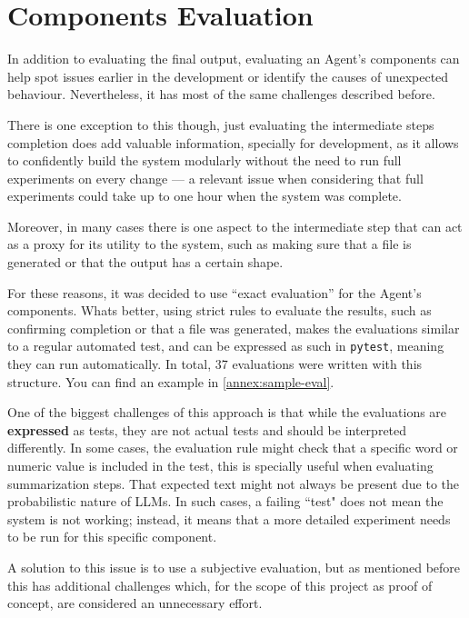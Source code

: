\documentclass[a4paper]{report}
\begin{document}
\section{Components Evaluation}
\label{sec:components-evals}

In addition to evaluating the final output, evaluating an Agent's components can help spot issues earlier in the development or identify the causes of unexpected behaviour. Nevertheless, it has most of the same challenges described before.

There is one exception to this though, just evaluating the intermediate steps completion does add valuable information, specially for development, as it allows to confidently build the system modularly without the need to run full experiments on every change --- a relevant issue when considering that full experiments could take up to one hour when the system was complete.

Moreover, in many cases there is one aspect to the intermediate step that can act as a proxy for its utility to the system, such as making sure that a file is generated or that the output has a certain shape.

For these reasons, it was decided to use ``exact evaluation'' for the Agent's components. Whats better, using strict rules to evaluate the results, such as confirming completion or that a file was generated, makes the evaluations similar to a regular automated test, and can be expressed as such in \texttt{pytest}, meaning they can run automatically. In total, 37 evaluations were written with this structure. You can find an example in \autoref{annex:sample-eval}.

One of the biggest challenges of this approach is that while the evaluations are \textbf{expressed} as tests, they are not actual tests and should be interpreted differently. In some cases, the evaluation rule might check that a specific word or numeric value is included in the test, this is specially useful when evaluating summarization steps. That expected text might not always be present due to the probabilistic nature of LLMs. In such cases, a failing ``test" does not mean the system is not working; instead, it means that a more detailed experiment needs to be run for this specific component.

A solution to this issue is to use a subjective evaluation, but as mentioned before this has additional challenges which, for the scope of this project as proof of concept, are considered an unnecessary effort.
\end{document}
